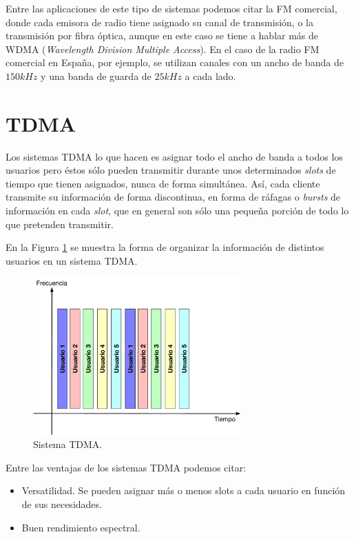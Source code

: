 \documentclass[es,apuntes]{uah}
\begin{document}
Entre las aplicaciones de este tipo de sistemas podemos citar la FM comercial, donde cada emisora de radio tiene asignado su canal de transmisión, o la transmisión por fibra óptica, aunque en este caso se tiene a hablar más de WDMA (\textit{Wavelength Division Multiple Access}). En el caso de la radio FM comercial en España, por ejemplo, se utilizan canales con un ancho de banda de $150kHz$ y una banda de guarda de $25kHz$ a cada lado. 

\section{TDMA}

Los sistemas TDMA lo que hacen es asignar todo el ancho de banda a todos los usuarios pero éstos sólo pueden transmitir durante unos determinados \emph{slots} de tiempo que tienen asignados, nunca de forma simultánea. Así, cada cliente transmite su información de forma discontinua, en forma de ráfagas o \emph{bursts} de información en cada \emph{slot}, que en general son sólo una pequeña porción de todo lo que pretenden transmitir. 

En la Figura \ref{fig:TDMA} se muestra la forma de organizar la información de distintos usuarios en un sistema TDMA. 

\begin{figure}[h!]
	\centering\includegraphics[width=8cm]{./Figuras/TDMA}
	\caption{Sistema TDMA.}
	\label{fig:TDMA}
\end{figure}


Entre las ventajas de los sistemas TDMA podemos citar:

\begin{itemize}
	\item Versatilidad. Se pueden asignar más o menos slots a cada usuario en función de sus necesidades. 
	\item Buen rendimiento espectral.
\end{itemize}
\end{document}
